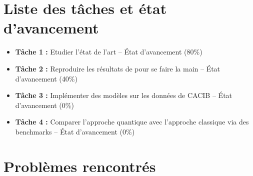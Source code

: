 \documentclass[11pt,a4paper]{article}
\begin{document}
\section{Liste des tâches et état d'avancement}

\begin{itemize}
    \item \textbf{Tâche 1 :} Etudier l'état de l'art -- État d'avancement (80\%)
    \item \textbf{Tâche 2 :} Reproduire les résultats de\cite{lloyd2020quantum} pour se faire la main -- État d'avancement (40\%)
    \item \textbf{Tâche 3 :} Implémenter des modèles sur les données de CACIB -- État d'avancement (0\%)
    \item \textbf{Tâche 4 :} Comparer l'approche quantique avec l'approche classique via des benchmarks -- État d'avancement (0\%)
\end{itemize}

\section{Problèmes rencontrés}



\end{document}
